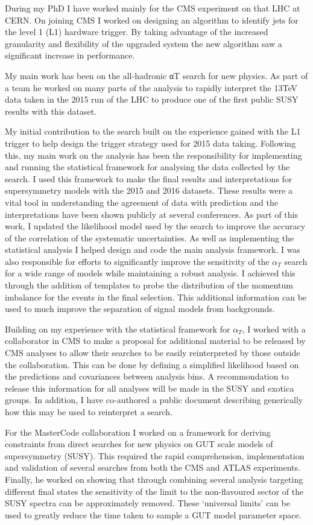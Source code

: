 \documentclass[twoside,a4paper]{article}
\begin{document}
During my PhD I have worked mainly for the CMS experiment on that LHC at CERN.
On joining CMS I worked on designing an algorithm to identify jets for the level 
1 (L1) hardware trigger. By taking advantage of the increased granularity and 
flexibility of the upgraded system the new algorithm saw a significant increase in performance.
 
My main work has been on the all-hadronic αT search for new physics. As part of a 
team he worked on many parts of the analysis to rapidly interpret the 13TeV 
data taken in the 2015 run of the LHC to produce one of the 
first public SUSY results with this dataset. 

My initial contribution to the search built on the experience gained with the L1 trigger to help 
design the trigger strategy used for 2015 data taking. Following this, my 
main work on the analysis has been the responsibility for implementing and running the 
statistical framework for analysing the data collected by the search. I used this 
framework to make the final results and interpretations for supersymmetry models with the 2015
and 2016 datasets. These results were a vital tool in understanding 
the agreement of data with prediction and the interpretations have been shown publicly at 
several conferences. As part of this work, I updated the likelihood model 
used by the search to improve the accuracy of the correlation of the systematic 
uncertainties. As well as implementing the statistical analysis I helped design and code 
the main analysis framework. I was also responsible for efforts to significantly improve 
the sensitivity of the $\alpha_T$ search for a wide range of models while maintaining 
a robust analysis. I achieved this through the addition of templates to probe 
the distribution of the momentum imbalance for the events in the final selection. 
This additional information can be used to much improve the separation of signal models 
from backgrounds. 

Building on my experience with the statistical framework for $\alpha_T$, I worked with a collaborator 
in CMS to make a proposal for additional material to be released by CMS analyses
to allow their searches to be easily reinterpreted by those outside the collaboration. 
This can be done by defining a simplified likelihood based on the predictions and covariances
between analysis bins. A recommondation to release this information for all analyses
will be made in the SUSY and exotica groups. In addition, I have co-authored a public document 
describing generically how this may be used to reinterpret a search.

For the MasterCode collaboration I worked on a framework for 
deriving constraints from direct searches for new physics on GUT scale models of supersymmetry 
(SUSY). This required the rapid comprehension, implementation and validation of several 
searches from both the CMS and ATLAS experiments. Finally, he worked on 
showing that through combining several analysis targeting different final states the sensitivity of the 
limit to the non-flavoured sector of the SUSY spectra can be approximately 
removed. These ‘universal limits’ can be used to greatly reduce the 
time taken to sample a GUT model parameter space.
\end{document}
